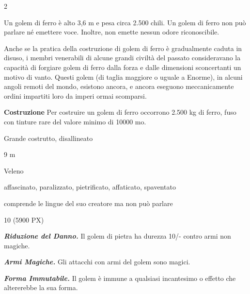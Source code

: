 \begin{multicols}{2}
{Un golem di ferro è alto 3,6 m e pesa circa 2.500 chili. Un golem di ferro non può parlare né emettere voce. Inoltre, non emette nessun odore riconoscibile.

Anche se la pratica della costruzione di golem di ferro è gradualmente caduta in disuso, i membri venerabili di alcune grandi civiltà del passato consideravano la capacità di forgiare golem di ferro dalla forza e dalle dimensioni sconcertanti un motivo di vanto. Questi golem (di taglia maggiore o uguale a Enorme), in alcuni angoli remoti del mondo, esistono ancora, e ancora eseguono meccanicamente ordini impartiti loro da imperi ormai scomparsi.

\textbf{Costruzione}
Per costruire un golem di ferro occorrono 2.500 kg di ferro, fuso con tinture rare del valore minimo di 10000 mo.

\begin{description}[noitemsep, topsep=0pt, parsep=0pt, partopsep=0pt, itemsep=1pt, leftmargin=2.35cm,  labelwidth=2.2cm, itemindent=0cm, listparindent=0pt] %
\setlength{\baselineskip}{10pt}
\item[\textbf{Taglia/Tipo}] Grande costrutto, disallineato
\item[\textbf{Caratt.}] 
\item[\textbf{Punti Ferita}] 
\item[\textbf{Movimento}] 9 m
\item[\textbf{Tiri Salvez.}] 
\item[\textbf{Imm. Danni}] Veleno
\item[\textbf{Immunità}] affascinato, paralizzato, pietrificato, affaticato, spaventato
\item[\textbf{Sensi}] 
\item[\textbf{Linguaggi}] comprende le lingue del suo creatore ma non può parlare
\item[\textbf{Sfida}] 10 (5900 PX)
\end{description}
\smallskip

\emph{\textbf{Riduzione del Danno.}} Il golem di pietra ha durezza 10/- contro armi non magiche.

\emph{\textbf{Armi Magiche.}} Gli attacchi con armi del golem sono magici.

\emph{\textbf{Forma Immutabile.}} Il golem è immune a qualsiasi incantesimo o effetto che altererebbe la sua forma.

}
\end{multicols}

